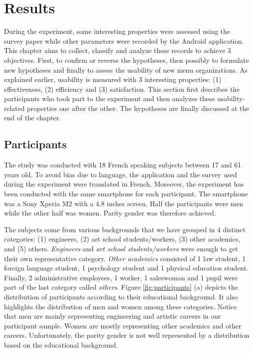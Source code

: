 \chapter{Results}

During the experiment, some interesting properties were assessed using the 
survey paper while other parameters were recorded by the Android application. 
This chapter aims to collect, classify and analyze these records to 
achieve 3 objectives. First, to confirm or reverse the hypotheses, then 
possibly to formulate new hypotheses and finally to assess the usability of 
new menu organizations. As explained earlier, usability is measured with 3 
interesting properties: (1)  effectiveness, (2) efficiency and (3) 
satisfaction. This section first describes the participants who took part to 
the experiment and then analyzes these usability-related properties one after 
the other. The hypotheses are finally discussed at the end of the chapter.

\section{Participants}

The study was conducted with 18 French speaking subjects between 17 and 61 
years old. To avoid bias due to language, the application and the survey 
used during the experiment were translated in French. Moreover, the experiment 
has been conducted with the same smartphone for each participant. The 
smartphone was a Sony Xperia M2 with a 4.8 inches screen. Half the 
participants were men while the other half was women. Parity gender was 
therefore achieved.\newline

The subjects come from various backgrounds that we have grouped in 4 
distinct categories: (1) engineers, (2) art school students/workers, (3) other 
academics, and (5) others. \textit{Engineers} and \textit{art school 
students/workers} were enough to get their own representative 
category. \textit{Other academics} consisted of 1 law student, 1 foreign 
language student, 1 psychology student and 1 physical education student. 
Finally, 2 administrative employees, 1 worker, 1 saleswoman and 1 pupil were 
part of the last category called \textit{others}. Figure \ref{fig:participants} 
(a) depicts the distribution of participants according to their educational 
background. It also highlights the distribution of men and women among these 
categories. Notice that men are mainly representing engineering and artistic 
careers in our participant sample. Women are mostly representing other academics 
and other careers. Unfortunately, the parity gender is not well represented by 
a distribution based on the educational background.

